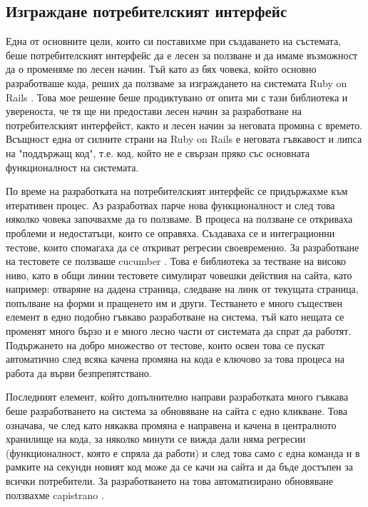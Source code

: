 \documentclass[a4paper,12pt]{article}
\begin{document}
  \subsection{Изграждане потребителският интерфейс}
    Една от основните цели, които си поставихме при създаването на състемата, беше потребителският интерфейс да е лесен за ползване и да имаме възможност да о променяме по лесен начин. Тъй като аз бях човека, който основно разработваше кода, реших да ползваме за изграждането на системата Ruby on Rails \cite{rubyonrails_site}. Това мое решение беше продиктувано от опита ми с тази библиотека и увереноста, че тя ще ни предостави лесен начин за разработване на потребителският интерфейст, както и лесен начин за неговата промяна с времето. Всъщност една от силните страни на Ruby on Rails е неговата гъвкавост и липса на "поддържащ код", т.е. код, който не е свързан пряко със основната функционалност на системата.
    
    По време на разработката на потребителският интерфейс се придържахме към итеративен процес. Аз разработвах парче нова функционалност и след това няколко човека започвахме да го ползваме. В процеса на ползване се откриваха проблеми и недостатъци, които се оправяха. Създаваха се и интеграционни тестове, които спомагаха да се откриват регресии своевременно. За разработване на тестовете се ползваше cucumber \cite{cucumber_site}. Това е библиотека за тестване на високо ниво, като в общи линии тестовете симулират човешки действия на сайта, като например: отваряне на дадена страница, следване на линк от текущата страница, попълване на форми и пращенето им и други. Тестването е много съществен елемент в едно подобно гъвкаво разработване на система, тъй като нещата се променят много бързо и е много лесно части от системата да спрат да работят. Подържането на добро множество от тестове, които освен това се пускат автоматично след всяка качена промяна на кода е ключово за това процеса на работа да върви безпрепятствано.
    
    Последният елемент, който допълнително направи разработката много гъвкава беше разработването на система за обновяване на сайта с едно кликване. Това означава, че след като някаква промяна е направена и качена в централното хранилище на кода, за няколко минути се вижда дали няма регресии (функционалност, която е спряла да работи) и след това само с една команда и в рамките на секунди новият код може да се качи на сайта и да бъде достъпен за всички потребители. За разработването на това автоматизирано обновяване ползвахме capistrano \cite{capistrano_site}.
    
\end{document}
